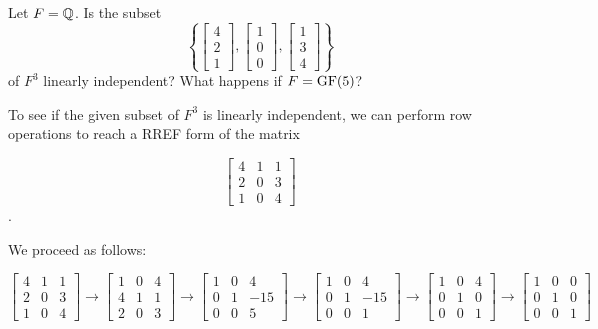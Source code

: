 \begin{ProbBox} %
\begin{problem}[Golan 163]
Let $F = \mathbb{Q}$.  Is the subset
\[
\left\{ 
\begin{bmatrix}
  4\\[0.3em] 2\\[0.3em] 1
\end{bmatrix},
\begin{bmatrix}
  1\\[0.3em] 0\\[0.3em] 0
\end{bmatrix},
\begin{bmatrix}
  1\\[0.3em] 3\\[0.3em] 4
\end{bmatrix}
\right\}
\]
of $F^3$ linearly independent?  What happens if $F = \operatorname{GF}(5)$?
\end{problem}
\smallskip
\begin{solution}
To see if the given subset of $F^3$ is linearly independent, we can perform row operations to reach a RREF form of the matrix

\[ \left[ \begin{array}{ccc}
4 & 1 & 1 \\
2 & 0 & 3 \\
1 & 0 & 4 
\end{array} \right]
\].

We proceed as follows:

\[ \left[ \begin{array}{ccc}
4 & 1 & 1 \\
2 & 0 & 3 \\
1 & 0 & 4 
\end{array} \right]
%
\rightarrow
%
\left[ \begin{array}{ccc}
1 & 0 & 4 \\
4 & 1 & 1 \\
2 & 0 & 3 
\end{array} \right]
%
\rightarrow
%
\left[ \begin{array}{ccc}
1 & 0 & 4 \\
0 & 1 & -15 \\
0 & 0 & 5
\end{array} \right]
%
\rightarrow
%
\left[ \begin{array}{ccc}
1 & 0 & 4 \\
0 & 1 & -15 \\
0 & 0 & 1
\end{array} \right]
%
\rightarrow
%
\left[ \begin{array}{ccc}
1 & 0 & 4 \\
0 & 1 & 0 \\
0 & 0 & 1
\end{array} \right]
%
\rightarrow
%
\left[ \begin{array}{ccc}
1 & 0 & 0 \\
0 & 1 & 0 \\
0 & 0 & 1
\end{array} \right]
\]


\end{solution}
\end{ProbBox}
